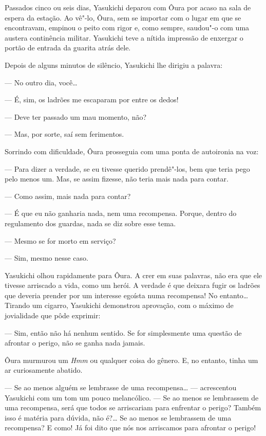 Passados cinco ou seis dias, Yasukichi deparou com Ôura por acaso na
sala de espera da estação. Ao vê"-lo, Ôura, sem se importar com o lugar
em que se encontravam, empinou o peito com rigor e, como sempre,
saudou"-o com uma austera continência militar. Yasukichi teve a nítida
impressão de enxergar o portão de entrada da guarita atrás dele.

Depois de alguns minutos de silêncio, Yasukichi lhe dirigiu a palavra:

--- No outro dia, você\ldots{}

--- É, sim, os ladrões me escaparam por entre os dedos!

--- Deve ter passado um mau momento, não?

--- Mas, por sorte, saí sem ferimentos.

Sorrindo com dificuldade, Ôura prosseguia com uma ponta de autoironia
na voz:

--- Para dizer a verdade, se eu tivesse querido prendê"-los, bem que teria
pego pelo menos um. Mas, se assim fizesse, não teria mais nada para
contar.

--- Como assim, mais nada para contar?

--- É que eu não ganharia nada, nem uma recompensa. Porque, dentro do
regulamento dos guardas, nada se diz sobre esse tema.

--- Mesmo se for morto em serviço?

--- Sim, mesmo nesse caso.

Yasukichi olhou rapidamente para Ôura. A crer em suas palavras, não era
que ele tivesse arriscado a vida, como um herói. A verdade é que
deixara fugir os ladrões que deveria prender por um interesse egoísta
numa recompensa! No entanto\ldots{} Tirando um cigarro, Yasukichi demonstrou
aprovação, com o máximo de jovialidade que pôde exprimir:

--- Sim, então não há nenhum sentido. Se for simplesmente uma questão de
afrontar o perigo, não se ganha nada jamais.

Ôura murmurou um \textit{Hmm} ou qualquer coisa do gênero. E, no entanto, tinha
um ar curiosamente abatido.

--- Se ao menos alguém se lembrasse de uma recompensa\ldots{} --- acrescentou
Yasukichi com um tom um pouco melancólico. --- Se ao menos se lembrassem
de uma recompensa, será que todos se arriscariam para enfrentar o
perigo? Também isso é matéria para dúvida, não é?\ldots{} Se ao menos se
lembrassem de uma recompensa? E como! Já foi dito que nós nos
arriscamos para afrontar o perigo!

